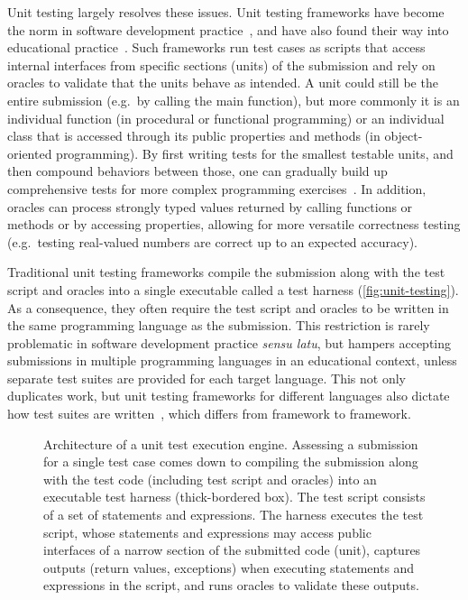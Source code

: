 \documentclass[../main]{subfiles}
\begin{document}
Unit testing largely resolves these issues.
Unit testing frameworks have become the norm in software development practice~\autocite{runesonSurveyUnitTesting2006}, and have also found their way into educational practice~\autocite{bettiniEnvironmentSelfassessingJava2004,ellsworthQuiverSystem2004}.
Such frameworks run test cases as scripts that access internal interfaces from specific sections (units) of the submission and rely on oracles to validate that the units behave as intended.
A unit could still be the entire submission (e.g.\ by calling the main function), but more commonly it is an individual function (in procedural or functional programming) or an individual class that is accessed through its public properties and methods (in object-oriented programming).
By first writing tests for the smallest testable units, and then compound behaviors between those, one can gradually build up comprehensive tests for more complex programming exercises~\autocite{panSoftwareTesting1999}.
In addition, oracles can process strongly typed values returned by calling functions or methods or by accessing properties, allowing for more versatile correctness testing (e.g.\ testing real-valued numbers are correct up to an expected accuracy).

Traditional unit testing frameworks compile the submission along with the test script and oracles into a single executable called a test harness (\vref{fig:unit-testing}).
As a consequence, they often require the test script and oracles to be written in the same programming language as the submission.
This restriction is rarely problematic in software development practice \emph{sensu latu}, but hampers accepting submissions in multiple programming languages in an educational context, unless separate test suites are provided for each target language.
This not only duplicates work, but unit testing frameworks for different languages also dictate how test suites are written~\autocite{agrawalSurveyGradingFormat2022,nayakAutomatedAssessmentTools2022}, which differs from framework to framework.

\begin{figure}
    \centering
    
    \caption{Architecture of a unit test execution engine. Assessing a submission for a single test case comes down to compiling the submission along with the test code (including test script and oracles) into an executable test harness (thick-bordered box). The test script consists of a set of statements and expressions. The harness executes the test script, whose statements and expressions may access public interfaces of a narrow section of the submitted code (unit), captures \textcolor{ugent-we}{outputs} (return values, exceptions) when executing statements and expressions in the script, and runs oracles to validate these outputs.\label{fig:unit-testing}}
\end{figure}
\end{document}
